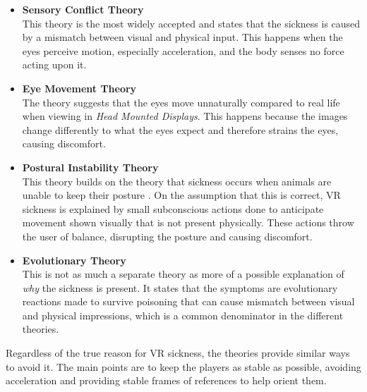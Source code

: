                 \begin{itemize}
                    \item \textbf{Sensory Conflict Theory} \\
                    This theory is the most widely accepted and states that the sickness is caused by a mismatch between visual and physical input. This happens when the eyes perceive motion, especially acceleration, and the body senses no force acting upon it.
                    
                    \SPACE
                
                    \item \textbf{Eye Movement Theory} \\
                    The theory suggests that the eyes move unnaturally compared to real life when viewing in \emph{Head Mounted Displays}. This happens because the images change differently to what the eyes expect and therefore strains the eyes, causing discomfort.
                    
                    \SPACE
                    
                    \item \textbf{Postural Instability Theory} \\
                    This theory builds on the theory that sickness occurs when animals are unable to keep their posture \cite{postural_instability}. On the assumption that this is correct, VR sickness is explained by small subconscious actions done to anticipate movement shown visually that is not present physically. These actions throw the user of balance, disrupting the posture and causing discomfort.
                    
                    \SPACE
                    
                    \item \textbf{Evolutionary Theory} \\
                    This is not as much a separate theory as more of a possible explanation of \emph{why} the sickness is present. It states that the symptoms are evolutionary reactions made to survive poisoning that can cause mismatch between visual and physical impressions, which is a common denominator in the different theories.
                \end{itemize}
                
                Regardless of the true reason for VR sickness, the theories provide similar ways to avoid it. The main points are to keep the players as stable as possible, avoiding acceleration and providing stable frames of references to help orient them.
            
